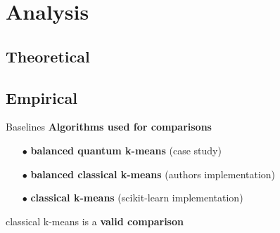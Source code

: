\section{Analysis}
	\subsection{Theoretical}
	
	\subsection{Empirical}

		\begin{frame}{Baselines}
		\textbf{Algorithms used for comparisons}
		\begin{itemize}
			\item[$\bullet$] \textbf{balanced quantum k-means} (case study)
			\item[$\bullet$] \textbf{balanced classical k-means} (authors implementation)
			\item[$\bullet$] \textbf{classical k-means} (scikit-learn implementation)
		\end{itemize}

		classical k-means is a \textbf{valid comparison}

		
		\end{frame}

